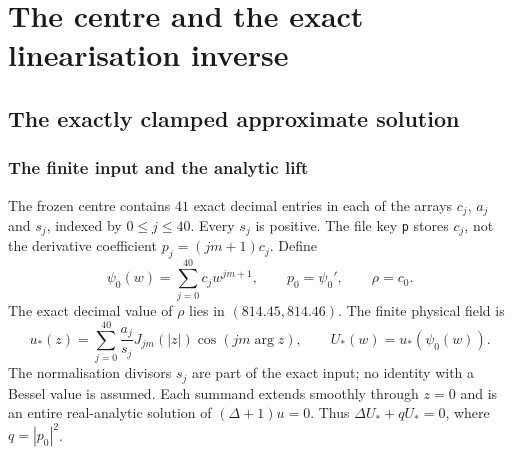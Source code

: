 \section{The centre and the exact linearisation inverse}\label{r2:sec:coupled}

\subsection{The exactly clamped approximate solution}\label{r2:sec:centre}

\subsubsection{The finite input and the analytic lift}
The frozen centre contains $41$ exact decimal entries in each of the arrays $c_j$, $a_j$ and $s_j$, indexed by $0\le j\le40$. Every $s_j$ is positive. The file key \texttt{p} stores $c_j$, not the derivative coefficient $p_j=(jm+1)c_j$. Define
\begin{equation}\label{r2:eq:finite-centre}
 \psi_0(w)=\sum_{j=0}^{40}c_jw^{jm+1},\qquad p_0=\psi_0',
 \qquad\rho=c_0.
\end{equation}
The exact decimal value of $\rho$ lies in $(814.45,814.46)$. The finite physical field is
\begin{equation}\label{r2:eq:physical-centre}
 u_*(z)=\sum_{j=0}^{40}\frac{a_j}{s_j}J_{jm}(|z|)\cos(jm\arg z),
 \qquad U_*(w)=u_*(\psi_0(w)).
\end{equation}
The normalisation divisors $s_j$ are part of the exact input; no identity with a Bessel value is assumed. Each summand extends smoothly through $z=0$ and is an entire real-analytic solution of $(\Delta+1)u=0$. Thus $\Delta U_*+qU_*=0$, where $q=|p_0|^2$.

